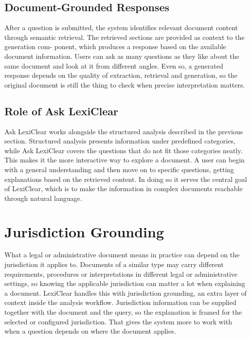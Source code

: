 \documentclass[12pt,a4paper,oneside]{report}
\begin{document}
\subsection{Document-Grounded Responses}

After a question is submitted, the system identifies relevant document content through
semantic retrieval. The retrieved sections are provided as context to the generation com-
ponent, which produces a response based on the available document information. Users can ask as many questions as they like about the same document and look at it from different angles. Even so, a generated response depends on the quality of extraction, retrieval and generation, so the original document is still the thing to check when precise interpretation matters.

\subsection{Role of Ask LexiClear}

Ask LexiClear works alongside the structured analysis described in the previous section. Structured analysis presents information under predefined categories, while Ask LexiClear covers the questions that do not fit those categories neatly. This makes it the more interactive way to explore a document. A user can begin with a general understanding and then move on to specific questions, getting explanations based on the retrieved content. In doing so it serves the central goal of LexiClear, which is to make the information in complex documents reachable through natural language.

\section{Jurisdiction Grounding}

What a legal or administrative document means in practice can depend on the jurisdiction it applies to. Documents of a similar type may carry different requirements, procedures or interpretations in different legal or administrative settings, so knowing the applicable jurisdiction can matter a lot when explaining a document. LexiClear handles this with jurisdiction grounding, an extra layer of context inside the analysis workflow. Jurisdiction information can be supplied together with the document and the query, so the explanation is framed for the selected or configured jurisdiction. That gives the system more to work with when a question depends on where the document applies.
\end{document}
